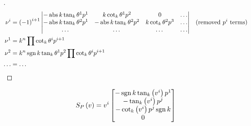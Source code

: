 \documentclass[stu, babel, american, biblatex, a4paper, draftall]{apa7}
\begin{document}
\begin{proof}[]
\begin{align*}
        \tensor{\nu}{^i}
                    & = \left(-1\right)^{i+1}
        \left\vert
        \begin{matrix}
            -\abs{k}\tan_k{\tensor{\theta}{^1}}\tensor{p}{^1} & k\cot_k{\tensor{\theta}{^1}}\tensor{p}{^2}        & 0                                          & \dots \\
            -\abs{k}\tan_k{\tensor{\theta}{^2}}\tensor{p}{^1} & -\abs{k}\tan_k{\tensor{\theta}{^2}}\tensor{p}{^2} & k\cot_k{\tensor{\theta}{^2}}\tensor{p}{^3} & \dots \\
            \dots                                             & \dots                                             & \dots                                      & \dots \\
        \end{matrix}
        \right\vert & \text{(removed $\tensor{p}{^i}$ terms)}                                                                                                       \\
        \tensor{\nu}{^1}
                    & = k^n \prod{\cot_k{\tensor{\theta}{^i}}\tensor{p}{^{i+1}}}                                                                                    \\
        \tensor{\nu}{^2}
                    & = k^n \sign{k} \tan_k{\tensor{\theta}{^1}}\tensor{p}{^2}\prod{\cot_k{\tensor{\theta}{^i}}\tensor{p}{^{i+1}}}                                  \\
        \dots       & = \dots
    \end{align*}
\end{proof}
\begin{lemma}\label{Model:ShapeOperator}
    \begin{equation*}
        S_{P}\left(v\right)
        = \tensor{v}{^i} \begin{bmatrix}
            -\sign{k}\tan_k\left(\tensor{v}{^i}\right)\tensor{p}{^1} \\
            -\tan_k\left(\tensor{v}{^i}\right)\tensor{p}{^j}         \\
            -\cot_k\left(\tensor{v}{^i}\right)\tensor{p}{^j}\sign{k} \\
            0                                                        \\
        \end{bmatrix}
    \end{equation*}
\end{lemma}
\end{document}

